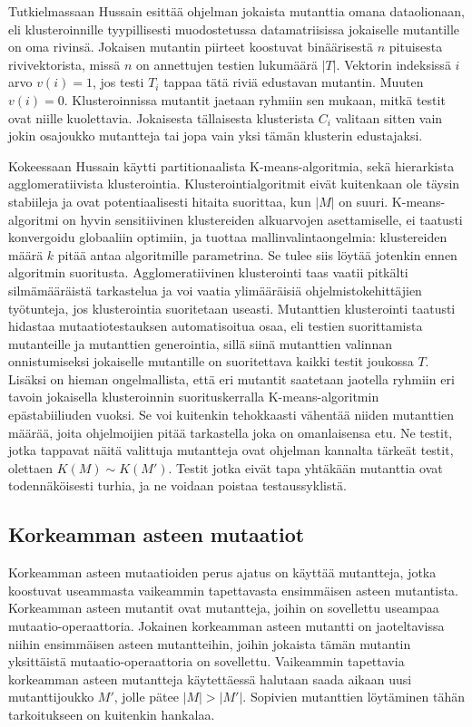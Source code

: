\documentclass[finnish]{tktltiki2}
\begin{document}
Tutkielmassaan Hussain esittää ohjelman jokaista mutanttia omana dataolionaan, eli klusteroinnille tyypillisesti muodostetussa datamatriisissa jokaiselle mutantille on oma rivinsä. Jokaisen mutantin piirteet koostuvat binäärisestä $n$ pituisesta rivivektorista, missä $n$ on annettujen testien lukumäärä $|T|$. Vektorin indeksissä $i$ arvo $v(i) = 1$, jos testi $T_i$ tappaa tätä riviä edustavan mutantin. Muuten $v(i) = 0$. Klusteroinnissa mutantit jaetaan ryhmiin sen mukaan, mitkä testit ovat niille kuolettavia. Jokaisesta tällaisesta klusterista $C_{i}$ valitaan sitten vain jokin osajoukko mutantteja tai jopa vain yksi tämän klusterin edustajaksi. 

Kokeessaan Hussain käytti partitionaalista K-means-algoritmia, sekä hierarkista agglomeratiivista klusterointia. Klusterointialgoritmit eivät kuitenkaan ole täysin stabiileja ja ovat potentiaalisesti hitaita suorittaa, kun $|M|$ on suuri. K-means-algoritmi on hyvin sensitiivinen klustereiden alkuarvojen asettamiselle, ei taatusti konvergoidu globaaliin optimiin, ja tuottaa mallinvalintaongelmia: klustereiden määrä $k$ pitää antaa algoritmille parametrina. Se tulee siis löytää jotenkin ennen algoritmin suoritusta. Agglomeratiivinen klusterointi taas vaatii pitkälti silmämääräistä tarkastelua ja voi vaatia ylimääräisiä ohjelmistokehittäjien työtunteja, jos klusterointia suoritetaan useasti. Mutanttien klusterointi taatusti hidastaa mutaatiotestauksen automatisoitua osaa, eli testien suorittamista mutanteille ja mutanttien generointia, sillä siinä mutanttien valinnan onnistumiseksi jokaiselle mutantille on suoritettava kaikki testit joukossa $T$. Lisäksi on hieman ongelmallista, että eri mutantit saatetaan jaotella ryhmiin eri tavoin jokaisella klusteroinnin suorituskerralla K-means-algoritmin epästabiiliuden vuoksi. Se voi kuitenkin tehokkaasti vähentää niiden mutanttien määrää, joita ohjelmoijien pitää tarkastella joka on omanlaisensa etu. Ne testit, jotka tappavat näitä valittuja mutantteja ovat ohjelman kannalta tärkeät testit, olettaen $K(M) \sim K(M')$. Testit jotka eivät tapa yhtäkään mutanttia ovat todennäköisesti turhia, ja ne voidaan poistaa testaussyklistä.

\subsection{Korkeamman asteen mutaatiot}
Korkeamman asteen mutaatioiden perus ajatus on käyttää mutantteja, jotka koostuvat useammasta vaikeammin tapettavasta ensimmäisen asteen mutantista. Korkeamman asteen mutantit ovat mutantteja, joihin on sovellettu useampaa mutaatio-operaattoria. Jokainen korkeamman asteen mutantti on jaoteltavissa niihin ensimmäisen asteen mutantteihin, joihin jokaista tämän mutantin yksittäistä mutaatio-operaattoria on sovellettu. Vaikeammin tapettavia korkeamman asteen mutantteja käytettäessä halutaan saada aikaan uusi mutanttijoukko $M'$, jolle pätee $|M| > |M'|$. Sopivien mutanttien löytäminen tähän tarkoitukseen on kuitenkin hankalaa. 
\end{document}
